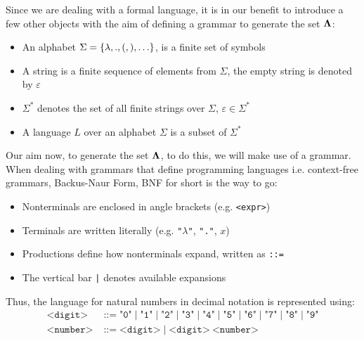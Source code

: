 Since we are dealing with a formal language, it is in our benefit to introduce a few other objects with the aim of defining a grammar to generate the set $\mathbf{\Lambda}$:
\begin{itemize}
\item An alphabet \( \Sigma = \{ \lambda, ., (, ), \ldots \} \), is a finite set of symbols
\item A string is a finite sequence of elements from \( \Sigma \), the empty string is denoted by \( \varepsilon \)
\item \( \Sigma^* \) denotes the set of all finite strings over \( \Sigma \), \( \varepsilon \in \Sigma^* \)
\item A language \( L \) over an alphabet \( \Sigma \) is a subset of \( \Sigma^* \)
\end{itemize}
Our aim now, to generate the set $\mathbf{\Lambda}$,  to do this, we will make use of a grammar. When dealing with grammars that define programming languages i.e. context-free grammars, Backus-Naur Form, BNF for short is the way to go:
\begin{itemize}
\item Nonterminals are enclosed in angle brackets (e.g. \texttt{<expr>})
\item Terminals are written literally (e.g. \texttt{"$\lambda$"}, \texttt{"."}, $x$)
\item Productions define how nonterminals expand, written as \texttt{::=}
\item The vertical bar \texttt{|} denotes available expansions
\end{itemize}
Thus, the language for natural numbers in decimal notation is represented using:
\begin{align*}
  \texttt{<digit>} &\;\texttt{::=}\; \texttt{"0"} \;\texttt{|}\; \texttt{"1"} \;\texttt{|}\; \texttt{"2"} \;\texttt{|}\; \texttt{"3"} \;\texttt{|}\; \texttt{"4"} \;\texttt{|}\; \texttt{"5"} \;\texttt{|}\; \texttt{"6"} \;\texttt{|}\; \texttt{"7"} \;\texttt{|}\; \texttt{"8"} \;\texttt{|}\; \texttt{"9"} \\
  \texttt{<number>} &\;\texttt{::=}\; \texttt{<digit>} \;|\; \texttt{<digit>} \ \texttt{<number>}
\end{align*}
